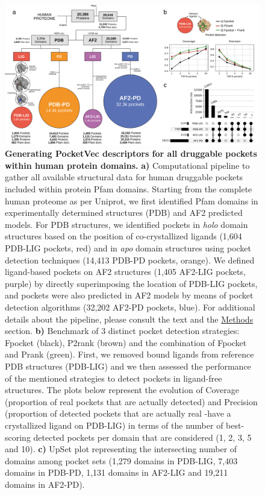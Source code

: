 \begin{figure}[htbp]
  \centering
  \includegraphics[width=0.1\linewidth]{figures/PocketVec/Main/Fig2.png} 
  \caption{
    \textbf{Generating PocketVec descriptors for all druggable pockets within human protein domains.} 
    \textbf{a)} Computational pipeline to gather all available structural data for human druggable pockets included within protein Pfam domains. Starting from the complete human proteome as per Uniprot, we first identified Pfam domains in experimentally determined structures (PDB) and AF2 predicted models. For PDB structures, we identified pockets in \textit{holo} domain structures based on the position of co-crystallized ligands (1,604 PDB-LIG pockets, red) and in \textit{apo} domain structures using pocket detection techniques (14,413 PDB-PD pockets, orange). We defined ligand-based pockets on AF2 structures (1,405 AF2-LIG pockets, purple) by directly superimposing the location of PDB-LIG pockets, and pockets were also predicted in AF2 models by means of pocket detection algorithms (32,202 AF2-PD pockets, blue).  For additional details about the pipeline, please consult the text and the \hyperref[PocketVec_Methods]{Methods} section.
    \textbf{b)} Benchmark of 3 distinct pocket detection strategies: Fpocket (black), P2rank (brown) and the combination of Fpocket and Prank (green). First, we removed bound ligands from reference PDB structures (PDB-LIG) and we then assessed the performance of the mentioned strategies to detect pockets in ligand-free structures. The plots below represent the evolution of Coverage (proportion of real pockets that are actually detected) and Precision (proportion of detected pockets that are actually real -have a crystallized ligand on PDB-LIG) in terms of the number of best-scoring detected pockets per domain that are considered (1, 2, 3, 5 and 10).
    \textbf{c)} UpSet plot representing the intersecting number of domains among pocket sets (1,279 domains in PDB-LIG, 7,403 domains in PDB-PD, 1,131 domains in AF2-LIG and 19,211 domains in AF2-PD).
  }
  \label{PocketVec_Fig2}
\end{figure}


